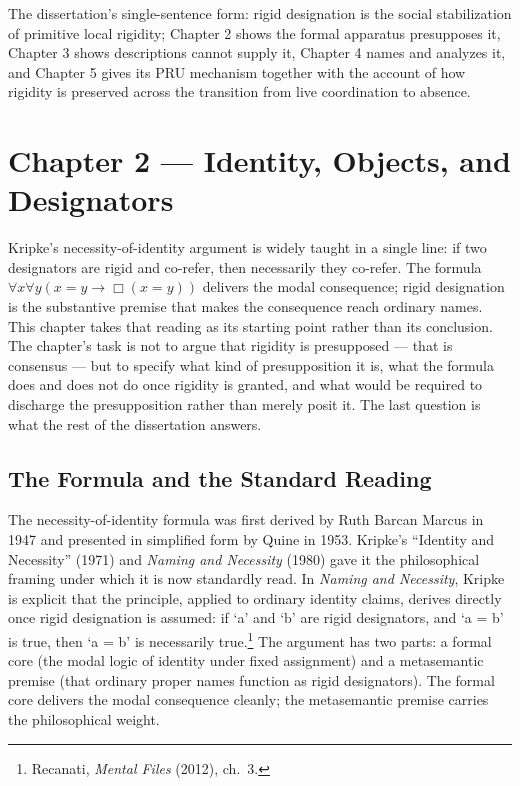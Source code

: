 \documentclass[12pt,a4paper]{article}
\begin{document}
The dissertation's single-sentence form: rigid designation is the social stabilization of primitive local rigidity; Chapter 2 shows the formal apparatus presupposes it, Chapter 3 shows descriptions cannot supply it, Chapter 4 names and analyzes it, and Chapter 5 gives its PRU mechanism together with the account of how rigidity is preserved across the transition from live coordination to absence.

\section{Chapter 2 --- Identity, Objects, and Designators}\label{chapter-2-identity-objects-and-designators}

Kripke's necessity-of-identity argument is widely taught in a single line: if two designators are rigid and co-refer, then necessarily they co-refer. The formula \(\forall x \forall y (x=y \to \Box(x=y))\) delivers the modal consequence; rigid designation is the substantive premise that makes the consequence reach ordinary names. This chapter takes that reading as its starting point rather than its conclusion. The chapter's task is not to argue that rigidity is presupposed --- that is consensus --- but to specify what kind of presupposition it is, what the formula does and does not do once rigidity is granted, and what would be required to discharge the presupposition rather than merely posit it. The last question is what the rest of the dissertation answers.

\subsection{The Formula and the Standard Reading}\label{the-formula-and-the-standard-reading}

The necessity-of-identity formula was first derived by Ruth Barcan Marcus in 1947 and presented in simplified form by Quine in 1953. Kripke's ``Identity and Necessity'' (1971) and \emph{Naming and Necessity} (1980) gave it the philosophical framing under which it is now standardly read. In \emph{Naming and Necessity}, Kripke is explicit that the principle, applied to ordinary identity claims, derives directly once rigid designation is assumed: if `a' and `b' are rigid designators, and `a = b' is true, then `a = b' is necessarily true.\footnote{Recanati, \emph{Mental Files} (2012), ch.~3.} The argument has two parts: a formal core (the modal logic of identity under fixed assignment) and a metasemantic premise (that ordinary proper names function as rigid designators). The formal core delivers the modal consequence cleanly; the metasemantic premise carries the philosophical weight.
\end{document}
